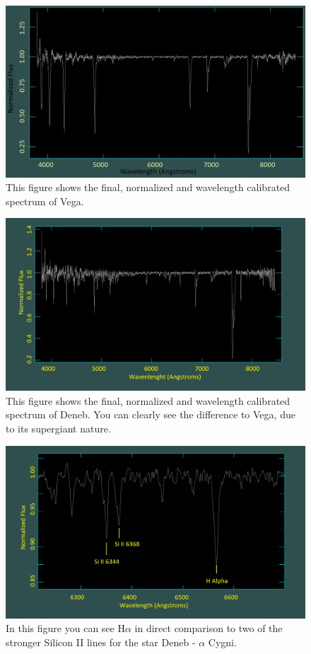 \documentclass{article}
\begin{document}
\begin{figure}[H]
  	\centering
    \includegraphics[width=1.00\textwidth]{spectroscopy/vega_spectrum_calib_norm.jpg}
  	\caption{This figure shows the final, normalized and wavelength calibrated spectrum of Vega. }
  	\label{fig:10}
\end{figure}

\begin{figure}[H]
	\centering
    \includegraphics[width=1.00\textwidth]{spectroscopy/deneb_spec.jpg}
  	\caption{This figure shows the final, normalized and wavelength calibrated spectrum of Deneb. You can clearly see the difference to Vega, due to its supergiant nature.}
  	\label{fig:11}
\end{figure}

\begin{figure}[H]
	\centering
    \includegraphics[width=1.00\textwidth]{spectroscopy/silicon_lines_deneb.png}
  	\caption{In this figure you can see H$\alpha$ in direct comparison to two of the stronger Silicon II lines for the star Deneb - $\alpha$ Cygni.}
  	\label{fig:12}
\end{figure}
\end{document}
